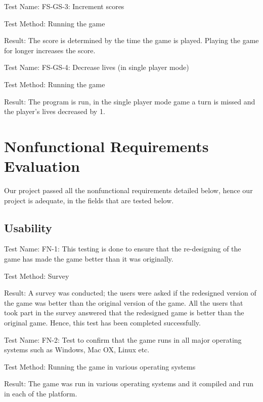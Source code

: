 \documentclass{article}
\begin{document}
\vspace{5mm}


Test Name: FS-GS-3: Increment scores \par
Test Method: Running the game \par
Result: The score is determined by the time the game is played. Playing the game for longer increases the score. \par

\vspace{5mm}


Test Name: FS-GS-4: Decrease lives (in single player mode) \par
Test Method: Running the game \par
Result: The program is run, in the single player mode game a turn is missed and the player’s lives decreased by 1. \par

\vspace{5mm}




\section{Nonfunctional Requirements Evaluation}
Our project passed all the nonfunctional requirements detailed below, hence our project is adequate, in the fields that are tested below.

\subsection {Usability}
Test Name: FN-1: This testing is done to ensure that the re-designing of the game has made the game better than it was originally. \par
Test Method: Survey \par
Result: A survey was conducted; the users were asked if the redesigned version of the game was better than the original version of the game. All the users that took part in the survey answered that the redesigned game is better than the original game. Hence, this test has been completed successfully. \par

\vspace{5mm}


Test Name: FN-2: Test to conﬁrm that the game runs in all major operating systems such as Windows, Mac OX, Linux etc. \par
Test Method: Running the game in various operating systems \par
Result: The game was run in various operating systems and it compiled and run in each of the platform. \par
\end{document}
